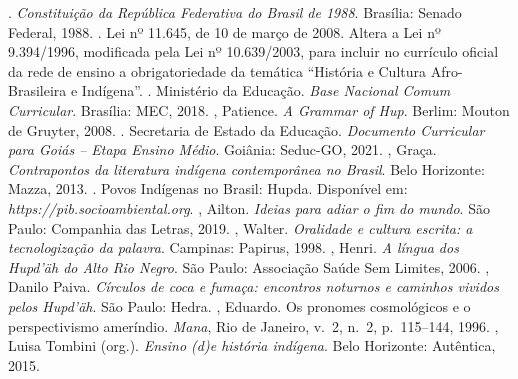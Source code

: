 \begin{bibliohedra}
. \textit{Constituição da República Federativa do
Brasil de 1988}. Brasília: Senado Federal, 1988.
. Lei nº 11.645, de 10 de março de 2008. Altera a
Lei nº 9.394/1996, modificada pela Lei nº 10.639/2003, para incluir no
currículo oficial da rede de ensino a obrigatoriedade da temática
``História e Cultura Afro-Brasileira e Indígena''.
. Ministério da Educação. \textit{Base Nacional
Comum Curricular}. Brasília: MEC, 2018.
, Patience. \textit{A Grammar of Hup}. Berlim: Mouton
de Gruyter, 2008.
. Secretaria de Estado da Educação.
\textit{Documento Curricular para Goiás -- Etapa Ensino Médio}.
Goiânia: Seduc-GO, 2021.
, Graça. \textit{Contrapontos da literatura
indígena contemporânea no Brasil}. Belo Horizonte: Mazza, 2013.
. Povos Indígenas no Brasil:
Hupda. Disponível em: \textit{https://pib.socioambiental.org}.
, Ailton. \textit{Ideias para adiar o fim do
mundo}. São Paulo: Companhia das Letras, 2019.
, Walter. \textit{Oralidade e cultura escrita: a
tecnologização da palavra}. Campinas: Papirus, 1998.
, Henri. \textit{A língua dos Hupd'äh do Alto Rio
Negro}. São Paulo: Associação Saúde Sem Limites, 2006.
, Danilo Paiva. \textit{Círculos de coca e fumaça:
encontros noturnos e caminhos vividos pelos Hupd'äh}. São Paulo: Hedra.
, Eduardo. Os pronomes cosmológicos e o
perspectivismo ameríndio. \textit{Mana}, Rio de Janeiro, v.~2, n.~2,
p.~115--144, 1996.
, Luisa Tombini (org.). \textit{Ensino (d)e
história indígena}. Belo Horizonte: Autêntica, 2015.
\end{bibliohedra}
